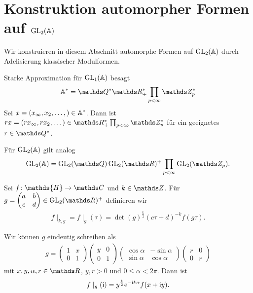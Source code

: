\chapter{Konstruktion automorpher Formen auf $\operatorname{GL}_2(\mathbb{A})$}
Wir konstruieren in diesem Abschnitt automorphe Formen auf $\operatorname{GL}_2(\mathbb{A})$
durch Adelisierung klassischer Modulformen.

Starke Approximation für $\operatorname{GL}_1(\mathbb{A})$ besagt
\begin{align*}
\A^\ast=\Q^\ast \R_+^\ast \prod_{p <\infty} \Z_p^\ast
\end{align*}
Sei $x=(x_\infty,x_2,\dots,)\in \mathbb{A}^\ast$. Dann ist $rx=(rx_\infty,rx_2,\dots) \in \R_+^\ast \prod_{p<\infty} \Z_p^\ast$ für ein geeignetes $r \in \Q^\ast$.

Für $\operatorname{GL}_2(\mathbb{A})$ gilt analog
\begin{align*}
\GL_2(\A)=\GL_2(\Q) \GL_2(\R)^+ \prod_{p<\infty} \GL_2(\Z_p).
\end{align*}

Sei $f \colon \mathds{H} \to \C$ und $k\in \Z$. Für $g=\begin{pmatrix}
a &b\\
c&d
\end{pmatrix} \in \GL_2(\R)^+$ definieren wir
\begin{align*}
f\mid_{k,g}=f\mid_g(\tau)=\det(g)^{\frac{k}{2}} (c\tau+d)^{-k} f(g\tau).
\end{align*}

Wir können $g$ eindeutig schreiben als
\begin{align*}
g=\begin{pmatrix}
1 &x\\
0 &1
\end{pmatrix}
\begin{pmatrix}
y &0\\
0 &1
\end{pmatrix}
\begin{pmatrix}
\cos \alpha & -\sin \alpha\\
\sin \alpha &\cos \alpha
\end{pmatrix}
\begin{pmatrix}
r &0\\
0 &r
\end{pmatrix}
\end{align*}
mit $x,y,\alpha,r\in \R$, $y,r>0$ und $0\leq \alpha <2 \pi$.
Dann ist
\begin{align*}
f\mid_g(\mathrm{i})=y^{\frac{k}{2}} \mathrm{e}^{-\mathrm{i}k\alpha} f(x+\mathrm{i}y).
\end{align*}


